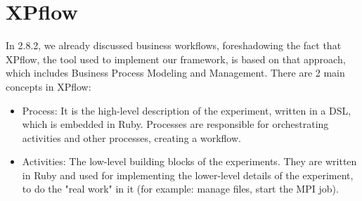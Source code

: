 \section{XPflow}
In 2.8.2, we already discussed business workflows, foreshadowing the
fact that XPflow, the tool used to implement our framework, is based
on that approach, which includes Business Process Modeling and
Management. There are 2 main concepts in XPflow\cite{bn12_2}:
\begin{itemize}
\item Process: It is the high-level description of the experiment,
  written in a DSL, which is embedded in Ruby. Processes are
  responsible for orchestrating activities and other processes,
  creating a workflow.
\item Activities: The low-level building blocks of the
  experiments. They are written in Ruby and used for implementing the
  lower-level details of the experiment, to do the "real work" in it
  (for example: manage files, start the MPI job).
\end{itemize}
